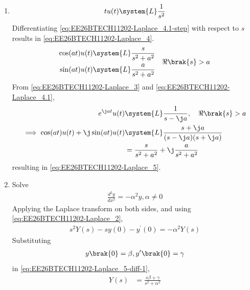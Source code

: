 \begin{enumerate}[label=\thesubsection.\arabic*, ref=\thesubsection.\theenumi]
\begin{align}
	u(t) \system{L} \frac{1}{s} 
	\label{eq:EE26BTECH11202-Laplace_4.1}
\end{align}
\solution
\begin{align}
 \int_{0}^{\infty}  e^{-st} \, dt 
 = \brak{-\frac{e^{-st}}{s}}_{0}^{\infty}  = \frac{1}{s} \quad \Re\brak{s} > 0
\label{eq:EE26BTECH11202-Laplace_4.1-step}
\end{align}
\item 
\begin{align}
	tu(t) \system{L} \frac{1}{s^2} \label{eq:EE26BTECH11202-Laplace_4}
\end{align}
\solution Differentiating
\eqref{eq:EE26BTECH11202-Laplace_4.1-step}
with respect to $s$ results in 
\eqref{eq:EE26BTECH11202-Laplace_4}.
\begin{align}
\begin{split}
	\cos(at) u(t)\system{L} \frac{s}{s^2 + a^2} 
	\\
	\sin(at) u(t)\system{L} \frac{a}{s^2 + a^2}  
\end{split}
\quad 
\Re\brak{s}>a 
\label{eq:EE26BTECH11202-Laplace_5}
\end{align}
\solution
From \eqref{eq:EE26BTECH11202-Laplace_3} and \eqref{eq:EE26BTECH11202-Laplace_4.1},
\begin{align}
	e^{\j at} u(t)&\system{L}  \frac{1}{s-\j a}, \quad  \Re\brak{s}>a \\
	\implies {\cos(at)u(t) + \j\sin(at)u(t)} &\system{L}
	\frac{s + \j a}{(s - \j a)(s + \j a)} 
						 \\
						 &= \frac{s}{s^2 + a^2} + \j \frac{a}{s^2 + a^2}
\end{align}
resulting in \eqref{eq:EE26BTECH11202-Laplace_5}.
\item Solve 
\begin{align}
	\frac{d^2 y}{d x^2}= -\alpha^2 y, \alpha \neq 0
\label{eq:EE26BTECH11202-Laplace_5-diff}
\end{align}
\solution 
Applying the Laplace transform on both sides, and using \eqref{eq:EE26BTECH11202-Laplace_2},
\begin{align}
	s^2Y(s)-sy(0)-y^{\prime}(0)=-\alpha^2 Y(s)
\label{eq:EE26BTECH11202-Laplace_5-diff-1}
\end{align}
Substituting
\begin{align}
y\brak{0} = \beta, y^{\prime}\brak{0} = \gamma
\end{align}
in \eqref{eq:EE26BTECH11202-Laplace_5-diff-1},
\begin{align}
	Y(s)&=\frac{s\beta + \gamma}{s^2 + \alpha^2}
\\

\end{align}
\end{enumerate}
